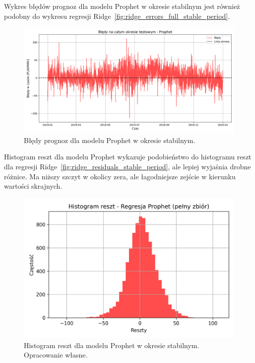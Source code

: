 Wykres błędów prognoz dla modelu Prophet w okresie stabilnym jest również podobny do wykresu regresji Ridge~\ref{fig:ridge_errors_full_stable_period}.

\begin{figure}[H]
    \centering
    \includegraphics[width=1.0\textwidth]{../../plots/predicts/errors_over_time_Prophet_full_stable_period.png}
    \caption{Błędy prognoz dla modelu Prophet w okresie stabilnym.}
    \label{fig:prophet_errors_full_stable_period}
\end{figure}

Histogram reszt dla modelu Prophet wykazuje podobieństwo do histogramu reszt dla regresji Ridge~\ref{fig:ridge_residuals_stable_period}, ale lepiej wyjaśnia drobne różnice. Ma niższy szczyt w okolicy zera, ale łagodniejsze zejście w kierunku wartości skrajnych.

\begin{figure}[H]
    \centering
    \includegraphics[width=1.0\textwidth]{../../plots/predicts/residuals_histogram_Prophet_full_stable_period_comb_1.png}
    \caption{Histogram reszt dla modelu Prophet w okresie stabilnym. Opracowanie własne.}
    \label{fig:prophet_residuals_stable}
\end{figure}

